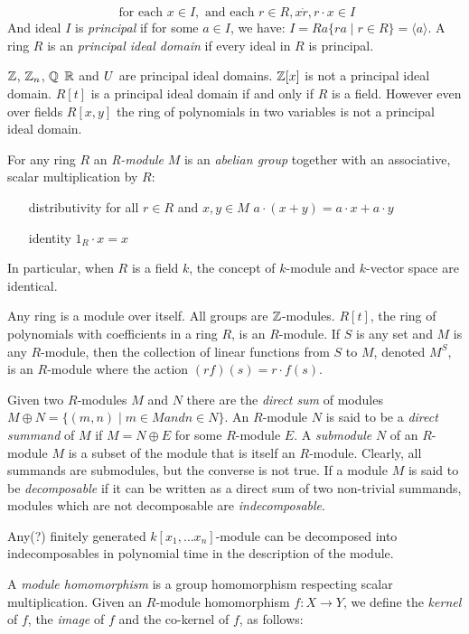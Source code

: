 \[ \textrm{ for each } x \in I, \textrm{ and each } r \in R, x \dot r, r \cdot x \in I  \]
And ideal $I$ is \emph{principal} if for some $a \in I$, we have: $I = Ra \{ ra \mid r \in R\} = \langle a \rangle$.
A ring $R$ is an \emph{principal ideal domain} if every ideal in $R$ is principal.
\begin{example}
$\mathbb{Z}$, $\mathbb{Z}_n$, $\mathbb{Q}$ $\mathbb{R}$ and $U$ are principal ideal domains. $\mathbb{Z}[x]$ is not a principal ideal domain. $R[t]$ is a principal ideal domain if and only if $R$ is a field. However
even over fields $R[x,y]$ the ring of polynomials in two variables is not a principal ideal domain.
\end{example}
For any ring $R$ an \emph{R-module} $M$ is an \emph{abelian group} together with an associative, scalar multiplication by $R$: 
\begin{itemize}
\item[distributivity] for all $r \in R$ and $x,y \in M$ $a \cdot (x + y)  = a \cdot x + a \cdot y$
\item[identity] $1_R \cdot x = x$
\end{itemize}
In particular, when $R$ is a field $k$, the concept of $k$-module and $k$-vector space are identical.
\begin{example}
Any ring is a module over itself.  All groups are $\mathbb{Z}$-modules. $R[t]$, the ring of polynomials with coefficients in a ring $R$, is an $R$-module. If $S$ is any set and $M$ is any $R$-module, then the collection of linear functions from $S$ to $M$, denoted $M^S$, is an $R$-module where the action $(rf)(s) =  r \cdot f(s)$.
\end{example}
Given two $R$-modules $M$ and $N$ there are the \emph{direct sum} of modules $M \oplus N = \{ (m,n) \mid m \in M and n \in N \}$.
An $R$-module $N$ is said to be a \emph{direct summand} of $M$ if $M = N \oplus E$ for some $R$-module $E$. 
A \emph{submodule} $N$ of an $R$-module $M$ is a subset of the module that is itself an $R$-module. Clearly, all summands are submodules, but the converse is not true.
If a module $M$ is said to be \emph{decomposable} if it can be written as a direct sum of two non-trivial summands, modules which are not decomposable are \emph{indecomposable}. 
\begin{theorem}
Any(?) finitely generated $k[x_1, \ldots x_n]$-module can be decomposed into indecomposables in polynomial time in the description of the module. 
\end{theorem}
A \emph{module homomorphism} is a group homomorphism respecting scalar multiplication. Given an $R$-module homomorphism $f: X \rightarrow Y $, we define the \emph{kernel} of $f$, the \emph{image} of $f$ and the co-kernel of $f$, as follows: 
